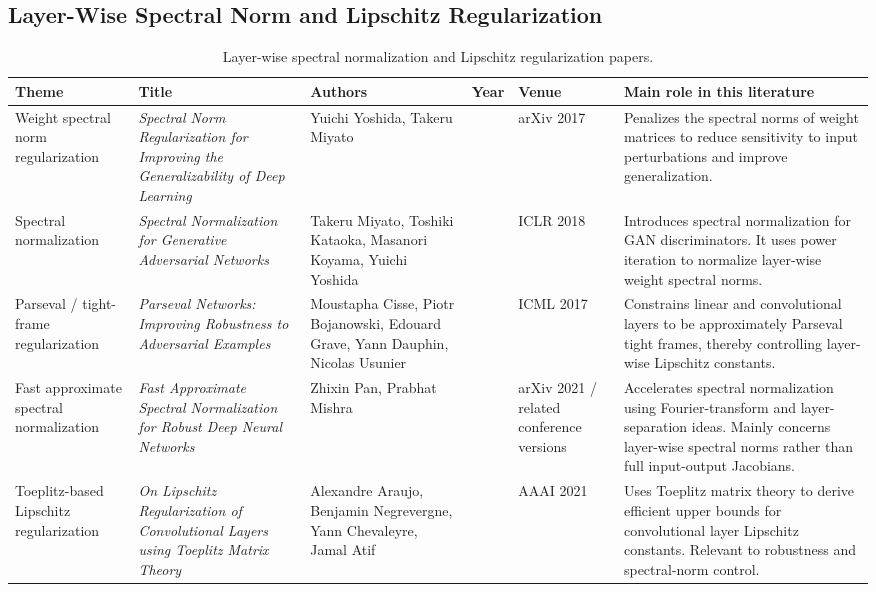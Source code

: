 \documentclass{article}
\begin{document}
\subsection{Layer-Wise Spectral Norm and Lipschitz Regularization}

\begin{landscape}
\begin{table}[p]
\centering
\footnotesize
\begin{tabular}{>{\raggedright\arraybackslash}p{2.4cm} >{\raggedright\arraybackslash}p{4.0cm} >{\raggedright\arraybackslash}p{3.4cm} >{\raggedright\arraybackslash}p{1.0cm} >{\raggedright\arraybackslash}p{3.2cm} >{\raggedright\arraybackslash}p{6.2cm}}
\hline
\textbf{Theme} & \textbf{Title} & \textbf{Authors} & \textbf{Year} & \textbf{Venue} & \textbf{Main role in this literature} \\
\hline
Weight spectral norm regularization &
\textit{Spectral Norm Regularization for Improving the Generalizability of Deep Learning} &
Yuichi Yoshida, Takeru Miyato &
2017 &
arXiv 2017 &
Penalizes the spectral norms of weight matrices to reduce sensitivity to input perturbations and improve generalization. \\
\hline
Spectral normalization &
\textit{Spectral Normalization for Generative Adversarial Networks} &
Takeru Miyato, Toshiki Kataoka, Masanori Koyama, Yuichi Yoshida &
2018 &
ICLR 2018 &
Introduces spectral normalization for GAN discriminators. It uses power iteration to normalize layer-wise weight spectral norms. \\
\hline
Parseval / tight-frame regularization &
\textit{Parseval Networks: Improving Robustness to Adversarial Examples} &
Moustapha Cisse, Piotr Bojanowski, Edouard Grave, Yann Dauphin, Nicolas Usunier &
2017 &
ICML 2017 &
Constrains linear and convolutional layers to be approximately Parseval tight frames, thereby controlling layer-wise Lipschitz constants. \\
\hline
Fast approximate spectral normalization &
\textit{Fast Approximate Spectral Normalization for Robust Deep Neural Networks} &
Zhixin Pan, Prabhat Mishra &
2021 &
arXiv 2021 / related conference versions &
Accelerates spectral normalization using Fourier-transform and layer-separation ideas. Mainly concerns layer-wise spectral norms rather than full input-output Jacobians. \\
\hline
Toeplitz-based Lipschitz regularization &
\textit{On Lipschitz Regularization of Convolutional Layers using Toeplitz Matrix Theory} &
Alexandre Araujo, Benjamin Negrevergne, Yann Chevaleyre, Jamal Atif &
2021 &
AAAI 2021 &
Uses Toeplitz matrix theory to derive efficient upper bounds for convolutional layer Lipschitz constants. Relevant to robustness and spectral-norm control. \\
\hline
\end{tabular}
\caption{Layer-wise spectral normalization and Lipschitz regularization papers.}
\end{table}
\end{landscape}
\end{document}
